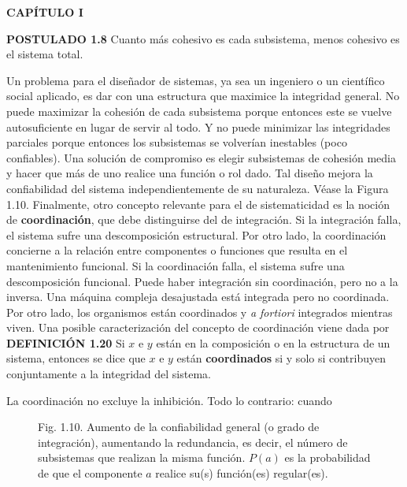 \newpage
\fancyhf{}
\fancyhead[l]{\thepage}
\begin{center}
{\fontsize{16}{18}\selectfont \textbf{CAPÍTULO I}}
\end{center}
\vspace{0.5cm}

{\fontsize{13}{15}\selectfont
\textbf{POSTULADO 1.8} Cuanto más cohesivo es cada subsistema, menos cohesivo es el sistema total.

Un problema para el diseñador de sistemas, ya sea un ingeniero o un científico social aplicado, es dar con una estructura que maximice la integridad general. No puede maximizar la cohesión de cada subsistema porque entonces este se vuelve autosuficiente en lugar de servir al todo. 
Y no puede minimizar las integridades parciales porque entonces los subsistemas se volverían inestables (poco confiables). Una solución de compromiso es elegir subsistemas de cohesión media y hacer que más de uno realice una función o rol dado. Tal diseño mejora la confiabilidad del sistema independientemente de su naturaleza. Véase la Figura 1.10.
Finalmente, otro concepto relevante para el de sistematicidad es la noción de \textbf{coordinación}, que debe distinguirse del de integración. Si la integración falla, el sistema sufre una descomposición estructural. 
Por otro lado, la coordinación concierne a la relación entre componentes o funciones que resulta en el mantenimiento funcional. Si la coordinación falla, el sistema sufre una descomposición funcional. Puede haber integración sin coordinación, pero no a la inversa. 
Una máquina compleja desajustada está integrada pero no coordinada. Por otro lado, los organismos están coordinados y \textit{a fortiori} integrados mientras viven. Una posible caracterización del concepto de coordinación viene dada por\\

\textbf{DEFINICIÓN 1.20} Si \( x \) e \( y \) están en la composición o en la estructura de un sistema, entonces se dice que \( x \) e \( y \) están \textbf{coordinados} si y solo si contribuyen conjuntamente a la integridad del sistema.

La coordinación no excluye la inhibición. Todo lo contrario: cuando
}

\begin{figure}[h!]
    \centering
    \caption*{Fig. 1.10. Aumento de la confiabilidad general (o grado de integración), aumentando la redundancia, es decir, el número de subsistemas que realizan la misma función. \( P(a) \) es la probabilidad de que el componente \( a \) realice su(s) función(es) regular(es).}
\end{figure}


